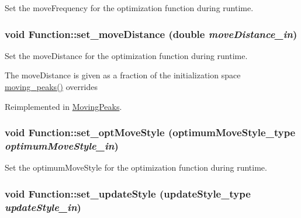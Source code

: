 Set the moveFrequency for the optimization function during runtime. 

\hypertarget{classFunction_36161c4387e7d67a916d86863c807e18}{
\subsubsection{\setlength{\rightskip}{0pt plus 5cm}void Function::set\_\-moveDistance (double {\em moveDistance\_\-in})}}
\label{classFunction_36161c4387e7d67a916d86863c807e18}


Set the moveDistance for the optimization function during runtime. 

The moveDistance is given as a fraction of the initialization space \hyperlink{optfunctions_8h_6e6333c061b2073ba9abaaf67e20164b9091fc9ba8ac52e7acab2c60d84758b3}{moving\_\-peaks()} overrides 

Reimplemented in \hyperlink{classMovingPeaks_eb39c06b043a569f8971fb5e98d2f63e}{MovingPeaks}.\hypertarget{classFunction_926edbee9ecdb70a054375c12d86dbb9}{
\subsubsection{\setlength{\rightskip}{0pt plus 5cm}void Function::set\_\-optMoveStyle ({\bf optimumMoveStyle\_\-type} {\em optimumMoveStyle\_\-in})}}
\label{classFunction_926edbee9ecdb70a054375c12d86dbb9}


Set the optimumMoveStyle for the optimization function during runtime. 

\hypertarget{classFunction_43f22a89270d1fb80a9e5cd97199edf8}{
\subsubsection{\setlength{\rightskip}{0pt plus 5cm}void Function::set\_\-updateStyle ({\bf updateStyle\_\-type} {\em updateStyle\_\-in})}}
\label{classFunction_43f22a89270d1fb80a9e5cd97199edf8}


